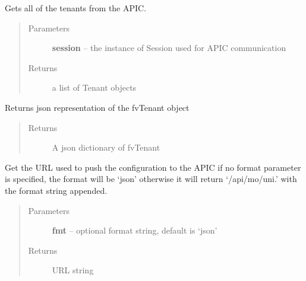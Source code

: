 \documentclass[letterpaper,10pt,english]{sphinxmanual}
\begin{document}
\begin{fulllineitems}
\begin{fulllineitems}
\end{fulllineitems}


\begin{fulllineitems}
\label{acitoolkit:acitoolkit.Tenant.get}
Gets all of the tenants from the APIC.
\begin{quote}\begin{description}
\item[{Parameters}] \leavevmode
\textbf{session} -- the instance of Session used for APIC communication

\item[{Returns}] \leavevmode
a list of Tenant objects

\end{description}\end{quote}

\end{fulllineitems}


\begin{fulllineitems}
\label{acitoolkit:acitoolkit.Tenant.get_json}
Returns json representation of the fvTenant object
\begin{quote}\begin{description}
\item[{Returns}] \leavevmode
A json dictionary of fvTenant

\end{description}\end{quote}

\end{fulllineitems}


\begin{fulllineitems}
\label{acitoolkit:acitoolkit.Tenant.get_url}
Get the URL used to push the configuration to the APIC
if no format parameter is specified, the format will be `json'
otherwise it will return `/api/mo/uni.' with the format string
appended.
\begin{quote}\begin{description}
\item[{Parameters}] \leavevmode
\textbf{fmt} -- optional format string, default is `json'

\item[{Returns}] \leavevmode
URL string

\end{description}\end{quote}

\end{fulllineitems}


\end{fulllineitems}
\end{document}
